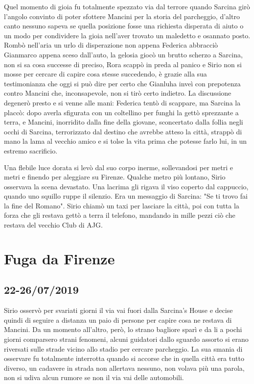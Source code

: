 Quel momento di gioia fu totalmente spezzato via dal terrore quando Sarcina girò l'angolo convinto di poter sfottere Mancini per la storia del parcheggio, d'altro canto nessuno sapeva se quella posizione fosse una richiesta disperata di aiuto o un modo per condividere la gioia nell'aver trovato un maledetto e osannato posto. Rombò nell'aria un urlo di disperazione non appena Federica abbracciò Gianmarco appena sceso dall'auto, la gelosia giocò un brutto scherzo a Sarcina, non si sa cosa successe di preciso, Rora scappò in preda al panico e Sirio non si mosse per cercare di capire cosa stesse succedendo, è grazie alla sua testimonianza che oggi si può dire per certo che Gianluha inveì con prepotenza contro Mancini che, inconsapevole, non si tirò certo indietro. La discussione degenerò presto e si venne alle mani: Federica tentò di scappare, ma Sarcina la placcò: dopo averla sfigurata con un coltellino per funghi la gettò sprezzante a terra, e Mancini, inorridito dalla fine della giovane, sconcertato dalla follia negli occhi di Sarcina, terrorizzato dal destino che avrebbe atteso la città, strappò di mano la lama al vecchio amico e si tolse la vita prima che potesse farlo lui, in un estremo sacrificio.

Una flebile luce dorata si levò dal suo corpo inerme, sollevandosi per metri e metri e finendo per aleggiare su Firenze.
Qualche metro più lontano, Sirio osservava la scena devastato.
Una lacrima gli rigava il viso coperto dal cappuccio, quando uno squillo ruppe il silenzio.
Era un messaggio di Sarcina: "Se ti trovo fai la fine del Romano".
Sirio chiamò un taxi per lasciare la città, poi con tutta la forza che gli restava gettò a terra il telefono, mandando in mille pezzi ciò che restava del vecchio Club di AJG.

\section{Fuga da Firenze}
\subsection*{22-26/07/2019}

Sirio osservò per svariati giorni il via vai fuori dalla Sarcina's House e decise quindi di seguire a distanza un paio di persone per capire cosa ne restava di Mancini. Da un momento all'altro, però, lo strano bagliore sparì e da li a pochi giorni comparsero strani fenomeni, alcuni guidatori dallo sguardo assorto si erano riversati sulle strade vicino allo stadio per cercare parcheggio. La sua smania di osservare fu totalmente interrotta quando si accorse che in quella città era tutto diverso, un cadavere in strada non allertava nessuno, non volava più una parola, non si udiva alcun rumore se non il via vai delle automobili.

